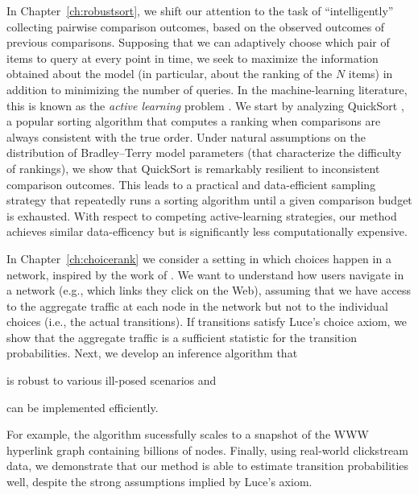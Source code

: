 In Chapter~\ref{ch:robustsort}, we shift our attention to the task of ``intelligently'' collecting pairwise comparison outcomes, based on the observed outcomes of previous comparisons.
Supposing that we can adaptively choose which pair of items to query at every point in time, we seek to maximize the information obtained about the model (in particular, about the ranking of the $N$ items) in addition to minimizing the number of queries.
In the machine-learning literature, this is known as the \emph{active learning} problem \citep{settles2012active}.
We start by analyzing QuickSort \citep{hoare1962quicksort}, a popular sorting algorithm that computes a ranking when comparisons are always consistent with the true order.
Under natural assumptions on the distribution of Bradley--Terry model parameters (that characterize the difficulty of rankings), we show that QuickSort is remarkably resilient to inconsistent comparison outcomes.
This leads to a practical and data-efficient sampling strategy that repeatedly runs a sorting algorithm until a given comparison budget is exhausted.
With respect to competing active-learning strategies, our method achieves similar data-efficency but is significantly less computationally expensive.

In Chapter~\ref{ch:choicerank} we consider a setting in which choices happen in a network, inspired by the work of \citet{kumar2015inverting}.
We want to understand how users navigate in a network (e.g., which links they click on the Web), assuming that we have access to the aggregate traffic at each node in the network but not to the individual choices (i.e., the actual transitions).
If transitions satisfy Luce's choice axiom, we show that the aggregate traffic is a sufficient statistic for the transition probabilities.
Next, we develop an inference algorithm that
\begin{enuminline}
\item is robust to various ill-posed scenarios and
\item can be implemented efficiently.
\end{enuminline}
For example, the algorithm sucessfully scales to a snapshot of the WWW hyperlink graph containing billions of nodes.
Finally, using real-world clickstream data, we demonstrate that our method is able to estimate transition probabilities well, despite the strong assumptions implied by Luce's axiom.

